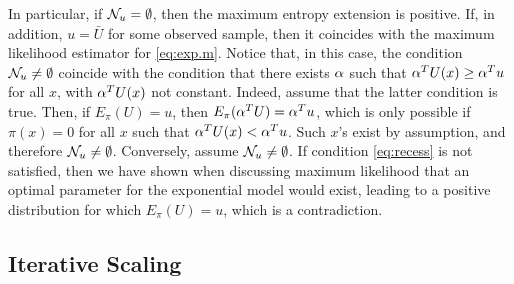 In particular, if ${\mathcal N}_u = \emptyset$, then the maximum entropy extension
is positive. If, in addition, $u = \bar U$ for some observed sample,
then it coincides with the maximum likelihood estimator for
\cref{eq:exp.m}. Notice that, in this case,  the condition ${\mathcal N}_u\neq\emptyset$ coincide
with the  condition that there exists $\alpha$ such that $\alpha^T U(x) \geq
\alpha^T u$ for all $x$, with $\alpha^T U(x)$ not constant. Indeed, assume
that the latter condition is true. Then, if $E_\pi(U) = u$, then $E_\pi(\alpha^T U) =
\alpha^T u$, which is only possible if $\pi(x) = 0$ for all $x$ such
that $\alpha^T U(x) < \alpha^T u$. Such $x$'s exist by assumption, and
therefore $\mathcal N_{u}\neq \emptyset$. Conversely, assume ${\mathcal N}_u\neq
\emptyset$. If condition \cref{eq:recess} is not satisfied, then we have
shown when discussing maximum likelihood that an optimal parameter for
the exponential model would exist, leading to a positive distribution
for which $E_\pi(U) = u$, which is a contradiction.  
 
\subsection{Iterative Scaling}
\label{sec:iter:scal}

